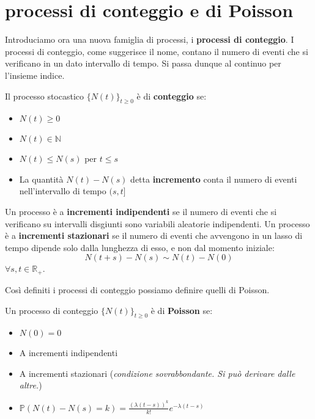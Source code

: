 \section{processi di conteggio e di Poisson}
Introduciamo ora una nuova famiglia di processi, i \textbf{processi di conteggio}. I processi di conteggio, come suggerisce il nome, contano il numero di eventi che si verificano in un dato intervallo di tempo. Si passa dunque al continuo per l'insieme indice.
\begin{definition}
Il processo stocastico $\{N(t)\}_{t\geq 0}$ è di \textbf{conteggio} se:
\begin{itemize}
    \item $N(t)\geq 0$
    \item $N(t)\in\mathbb{N}$
    \item $N(t)\leq N(s)$ per $t\leq s$
    \item La quantità $N(t)-N(s)$ detta \textbf{incremento} conta il numero di eventi nell'intervallo di tempo $(s,t]$
\end{itemize}
Un processo è a \textbf{incrementi indipendenti} se il numero di eventi che si verificano su intervalli disgiunti sono variabili aleatorie indipendenti. Un processo è a \textbf{incrementi stazionari} se il numero di eventi che avvengono in un lasso di tempo dipende solo dalla lunghezza di esso, e non dal momento iniziale: \[N(t+s)-N(s)\sim N(t)-N(0)\]
$\forall s,t\in\mathbb{R}_+$.
\end{definition}
Così definiti i processi di conteggio possiamo definire quelli di Poisson.
\begin{definition}[Poisson 1]
Un processo di conteggio $\{N(t)\}_{t\geq0}$ è di \textbf{Poisson} se:
\begin{itemize}
    \item $N(0)=0$
    \item A incrementi indipendenti
    \item A incrementi stazionari (\textit{condizione sovrabbondante. Si può derivare dalle altre.})
    \item $\mathbb{P}(N(t)-N(s)=k)=\frac{(\lambda(t-s))^k}{k!}e^{-\lambda(t-s)}$
\end{itemize}
\end{definition}

